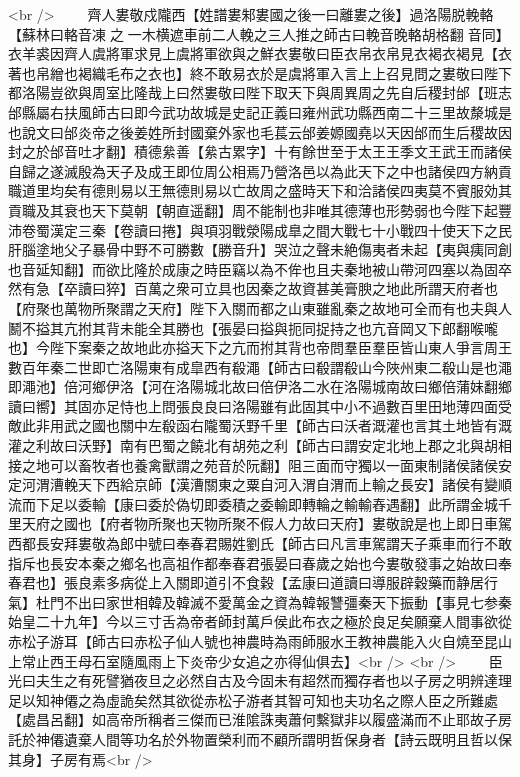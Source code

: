 <br />
　　齊人婁敬戍隴西【姓譜婁邾婁國之後一曰離婁之後】過洛陽脱輓輅【蘇林曰輅音凍之一木横遮車前二人輓之三人推之師古曰輓音晚輅胡格翻音同】衣羊裘因齊人虞將軍求見上虞將軍欲與之鮮衣婁敬曰臣衣帛衣帛見衣褐衣褐見【衣著也帛繒也褐織毛布之衣也】終不敢易衣於是虞將軍入言上上召見問之婁敬曰陛下都洛陽豈欲與周室比隆哉上曰然婁敬曰陛下取天下與周異周之先自后稷封邰【班志邰縣屬右扶風師古曰即今武功故城是史記正義曰雍州武功縣西南二十三里故漦城是也說文曰邰炎帝之後姜姓所封國棄外家也毛萇云邰姜嫄國堯以天因邰而生后稷故因封之於邰音吐才翻】積德絫善【絫古累字】十有餘世至于太王王季文王武王而諸侯自歸之遂滅殷為天子及成王即位周公相焉乃營洛邑以為此天下之中也諸侯四方納貢職道里均矣有德則易以王無德則易以亡故周之盛時天下和洽諸侯四夷莫不賓服効其貢職及其衰也天下莫朝【朝直遥翻】周不能制也非唯其德薄也形勢弱也今陛下起豐沛卷蜀漢定三秦【卷讀曰捲】與項羽戰滎陽成臯之間大戰七十小戰四十使天下之民肝腦塗地父子暴骨中野不可勝數【勝音升】哭泣之聲未絶傷夷者未起【夷與痍同創也音延知翻】而欲比隆於成康之時臣竊以為不侔也且夫秦地被山帶河四塞以為固卒然有急【卒讀曰猝】百萬之衆可立具也因秦之故資甚美膏腴之地此所謂天府者也【府聚也萬物所聚謂之天府】陛下入關而都之山東雖亂秦之故地可全而有也夫與人鬭不搤其亢拊其背未能全其勝也【張晏曰搤與扼同捉持之也亢音岡又下郎翻喉嚨也】今陛下案秦之故地此亦搤天下之亢而拊其背也帝問羣臣羣臣皆山東人爭言周王數百年秦二世即亡洛陽東有成皐西有殽澠【師古曰殽謂殽山今陜州東二殽山是也澠即澠池】倍河鄉伊洛【河在洛陽城北故曰倍伊洛二水在洛陽城南故曰鄉倍蒲妹翻鄉讀曰嚮】其固亦足恃也上問張良良曰洛陽雖有此固其中小不過數百里田地薄四面受敵此非用武之國也關中左殽函右隴蜀沃野千里【師古曰沃者溉灌也言其土地皆有溉灌之利故曰沃野】南有巴蜀之饒北有胡苑之利【師古曰謂安定北地上郡之北與胡相接之地可以畜牧者也養禽獸謂之苑音於阮翻】阻三面而守獨以一面東制諸侯諸侯安定河渭漕輓天下西給京師【漢漕關東之粟自河入渭自渭而上輸之長安】諸侯有變順流而下足以委輸【康曰委於偽切即委積之委輸即轉輪之輸輸舂遇翻】此所謂金城千里天府之國也【府者物所聚也天物所聚不假人力故曰天府】婁敬說是也上即日車駕西都長安拜婁敬為郎中號曰奉春君賜姓劉氏【師古曰凡言車駕謂天子乘車而行不敢指斥也長安本秦之鄉名也高祖作都奉春君張晏曰春歲之始也今婁敬發事之始故曰奉春君也】張良素多病從上入關即道引不食穀【孟康曰道讀曰導服辟穀藥而静居行氣】杜門不出曰家世相韓及韓滅不愛萬金之資為韓報讐彊秦天下振動【事見七参秦始皇二十九年】今以三寸舌為帝者師封萬戶侯此布衣之極於良足矣願棄人間事欲從赤松子游耳【師古曰赤松子仙人號也神農時為雨師服水王教神農能入火自燒至昆山上常止西王母石室隨風雨上下炎帝少女追之亦得仙俱去】<br />
<br />
　　臣光曰夫生之有死譬猶夜旦之必然自古及今固未有超然而獨存者也以子房之明辨達理足以知神僊之為虛詭矣然其欲從赤松子游者其智可知也夫功名之際人臣之所難處【處昌呂翻】如高帝所稱者三傑而已淮隂誅夷蕭何繫獄非以履盛滿而不止耶故子房託於神僊遺棄人間等功名於外物置榮利而不顧所謂明哲保身者【詩云既明且哲以保其身】子房有焉<br />
